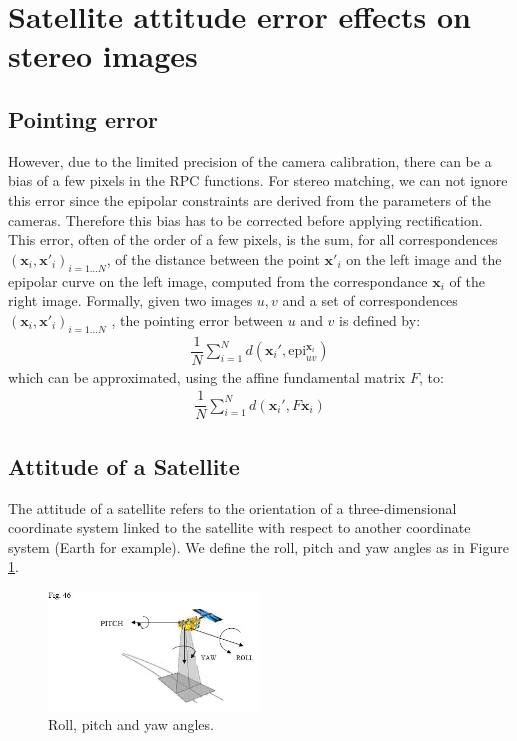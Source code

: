 \documentclass[paper=a4, fontsize=11pt, onecolumn, tikz, dvipsnames, svgnames, x11names]{article}
\begin{document}
\section{Satellite attitude error effects on stereo images}
\subsection{Pointing error}
However, due to the limited precision of the
camera calibration, there can be a bias of a few pixels in the RPC functions.
For stereo matching, we can not ignore this error since the epipolar constraints are derived from
the parameters of the cameras.
Therefore this bias has to be corrected before applying rectification.\\

This error, often of the order of a few pixels, is the sum, for all correspondences $(\textbf{x}_i, \textbf{x}'_i)_{i=1...N}$, of the distance between the point $\textbf{x}'_i$ on the left image and the epipolar curve on the left image, computed from the correspondance $\textbf{x}_i$ of the right image.
Formally, given two images $u, v$ and a set of correspondences $(\textbf{x}_i, \textbf{x}'_i)_{i=1...N}$ , the pointing error between $u$ and $v$ is defined by:
\begin{align*}
\dfrac{1}{N} \sum\limits_{i=1}^{N} d(\textbf{x}_i', \text{epi}_{uv}^{\textbf{x}_i})
\end{align*}
which can be approximated, using the affine fundamental matrix $F$, to:
\begin{align*}
\dfrac{1}{N} \sum\limits_{i=1}^{N} d(\textbf{x}_i', F\textbf{x}_i)
\end{align*}

\subsection{Attitude of a Satellite}
The attitude of a satellite refers to the orientation of a three-dimensional coordinate system linked to the satellite with respect to another coordinate system (Earth for example).
We define the roll, pitch and yaw angles as in Figure \ref{angles}.

\begin{figure}[h]
    \centering
    \includegraphics[width=0.5\textwidth]{figures/angles.jpg}
   \caption{ Roll, pitch and yaw angles.}
   \label{angles}
\end{figure}
\end{document}
